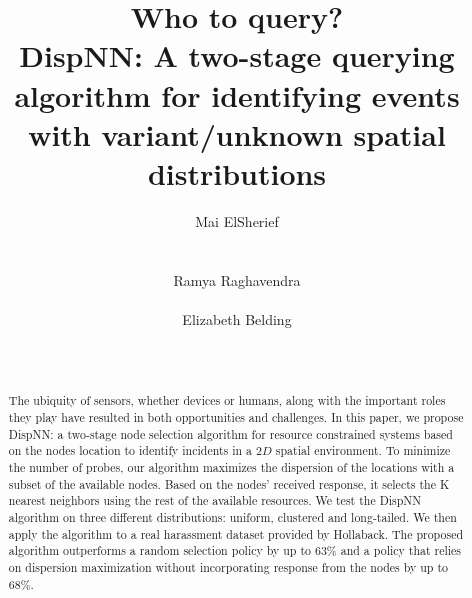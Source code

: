 \documentclass{acm_proc_article-sp}
\begin{document}
\title{Who to query? \\DispNN: A two-stage querying algorithm for identifying events with variant/unknown spatial distributions }
\author{
%
%
\alignauthor
Mai ElSherief\\
 \\
 \\
 \alignauthor
Ramya Raghavendra\\
 \\
\alignauthor
Elizabeth Belding\\
\\
 \\
}
\maketitle
\begin{abstract}
The ubiquity of sensors, whether devices or humans, along with the important roles they play have resulted in both opportunities and challenges. In this paper, we propose DispNN: a two-stage node selection algorithm for resource constrained systems based on the nodes location to identify incidents in a $2D$ spatial environment. To minimize the number of probes, our algorithm maximizes the dispersion of the locations with a subset of the available nodes. Based on the nodes' received response, it selects the K nearest neighbors using the rest of the available resources. We test the DispNN algorithm on three different distributions: uniform, clustered and long-tailed. We then apply the algorithm to a real harassment dataset provided by Hollaback. The proposed algorithm outperforms a random selection policy by up to $63\%$ and a policy that relies on dispersion maximization without incorporating response from the nodes by up to $68\%$.
\end{abstract}
\end{document}
